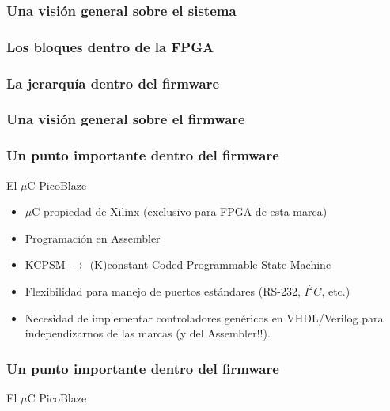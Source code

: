 \documentclass{beamer}
\begin{document}
\subsubsection{Una visión general sobre el sistema}

\begin{frame}
  \frametitle{Los bloques dentro de la FPGA}
  \begin{block}{}
    \centering
  \end{block}
\end{frame}

\begin{frame}
  \frametitle{La jerarquía dentro del firmware}
  \begin{block}{}
    \centering
  \end{block}
\end{frame}

\subsubsection{Una visión general sobre el firmware}

\begin{frame}
  \frametitle{Un punto importante dentro del firmware}
    \begin{block}{El $\mu$C PicoBlaze}
      \begin{itemize}[<+->]
        \item  $\mu$C propiedad de Xilinx (exclusivo para FPGA de esta marca)
        \item  Programación en Assembler
        \item  KCPSM $\rightarrow$ (K)constant Coded Programmable State
               Machine
        \item  Flexibilidad para manejo de puertos estándares (RS-232, $I^2C$,
               etc.)
        \item  Necesidad de implementar controladores genéricos en
               VHDL/Verilog para independizarnos de las marcas (y del
							 Assembler!!).
      \end{itemize}
    \end{block}
\end{frame}

\begin{frame}
  \frametitle{Un punto importante dentro del firmware}
  \begin{block}{El $\mu$C PicoBlaze}
    \centering
  \end{block}
\end{frame}
\end{document}
